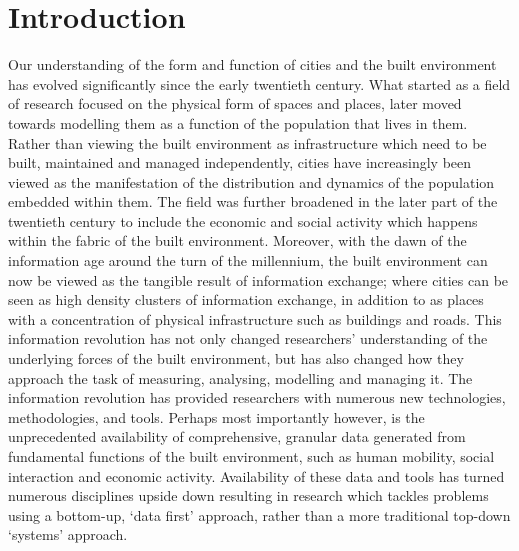 \chapter{Introduction} \label{chapter:introduction}

Our understanding of the form and function of cities and the built environment has evolved significantly since the early twentieth century.
What started as a field of research focused on the physical form of spaces and places, later moved towards modelling them as a function of the population that lives in them.
Rather than viewing the built environment as infrastructure which need to be built, maintained and managed independently, cities have increasingly been viewed as the manifestation of the distribution and dynamics of the population embedded within them.
The field was further broadened in the later part of the twentieth century to include the economic and social activity which happens within the fabric of the built environment.
Moreover, with the dawn of the information age around the turn of the millennium, the built environment can now be viewed as the tangible result of information exchange; where cities can be seen as high density clusters of information exchange, in addition to as places with a concentration of physical infrastructure such as buildings and roads.
This information revolution has not only changed researchers' understanding of the underlying forces of the built environment, but has also changed how they approach the task of measuring, analysing, modelling and managing it.
The information revolution has provided researchers with numerous new technologies, methodologies, and tools.
Perhaps most importantly however, is the unprecedented availability of comprehensive, granular data generated from fundamental functions of the built environment, such as human mobility, social interaction and economic activity.
Availability of these data and tools has turned numerous disciplines upside down resulting in research which tackles problems using a bottom-up, `data first' approach, rather than a more traditional top-down `systems' approach. 

